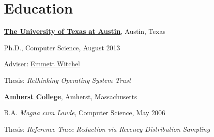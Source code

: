 \section{Education}
%
\href{http://www.utexas.edu/}{\textbf{The University of Texas at Austin}},
Austin, Texas
\begin{outerlist}

\item[] Ph.D., Computer Science, August 2013
        \begin{innerlist}
        \item Adviser:
              \href{http://www.cs.utexas.edu/~witchel/}
                   {Emmett Witchel}
        \item Thesis: {\em Rethinking Operating System Trust}
        \end{innerlist}

\end{outerlist}

\bigskip

\href{http://www.amherst.edu}{\textbf{Amherst College}}, Amherst,
Massachusetts
\begin{outerlist}
\item[] B.A. \emph{Magna cum Laude}, Computer Science, May 2006
        \begin{innerlist}
        \item Thesis: \emph{Reference Trace Reduction via Recency
Distribution Sampling}
        \end{innerlist}

\end{outerlist}